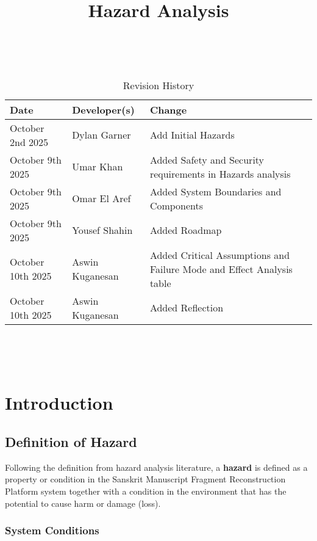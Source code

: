 \documentclass{article}
\title{Hazard Analysis\\\progname}
\author{\authname}
\date{}
\begin{document}
\maketitle
\thispagestyle{empty}

~\newpage


\begin{table}[hp]
\caption{Revision History} \label{TblRevisionHistory}
\begin{tabularx}{\textwidth}{llX}
\toprule
\textbf{Date} & \textbf{Developer(s)} & \textbf{Change}\\
\midrule
October 2nd 2025 & Dylan Garner & Add Initial Hazards\\
October 9th 2025 & Umar Khan & Added Safety and Security requirements in Hazards analysis\\
October 9th 2025 & Omar El Aref & Added System Boundaries and Components\\
October 9th 2025 & Yousef Shahin & Added Roadmap\\
October 10th 2025 & Aswin Kuganesan & Added Critical Assumptions and Failure Mode and Effect Analysis table\\
October 10th 2025 & Aswin Kuganesan & Added Reflection\\
\bottomrule
\end{tabularx}
\end{table}

~\newpage

\tableofcontents

~\newpage



\section{Introduction}

\subsection{Definition of Hazard}

Following the definition from hazard analysis literature, a \textbf{hazard} is defined as a property or condition in the Sanskrit Manuscript Fragment Reconstruction Platform system together with a condition in the environment that has the potential to cause harm or damage (loss).

\subsubsection{System Conditions}
\end{document}
